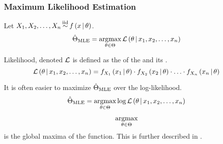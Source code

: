 		\subsubsection{Maximum Likelihood Estimation} \label{subsubsec:Maximum Likelihood Estimation}
			\begin{definition} \label{def:Maximum Likelihood Estimation}
				Let $ X_{1},X_{2},\ldots,X_{n} \operatorname{\overset{\text{iid}}{\operatorname{\sim}}} f \left( x \operatorname{\vert} \theta \right) $.
				\begin{equation} \label{eq:Maximum Likelihood Estimation}
					\hat{\Theta}_{\operatorname{\operatorname{MLE}}} = \operatorname*{argmax}_{\theta \in \Theta} \operatorname{\mathcal{L}} \left( \theta \operatorname{\vert} x_{1},x_{2},\ldots,x_{n} \right)
				\end{equation}
				\begin{remark} \label{rmk:Likelihood}
					Likelihood, denoted $\operatorname{\mathcal{L}}$ is defined as the  of the  and its .
					\begin{equation} \label{eq:Likelihood}
						\operatorname{\mathcal{L}} \left( \theta \operatorname{\vert} x_{1},x_{2},\ldots,x_{n} \right) = f_{X_{1}} \left( x_{1} \operatorname{\vert} \theta \right) \cdot f_{X_{2}} \left( x_{2} \operatorname{\vert} \theta \right) \cdot \ldots \cdot f_{X_{n}} \left( x_{n} \operatorname{\vert} \theta \right)
					\end{equation}
				\end{remark}
				\begin{remark}
					It is often easier to maximize $\hat{\Theta}_{\operatorname{\operatorname{MLE}}}$ over the log-likelihood.
					\begin{equation*}
						\hat{\Theta}_{\operatorname{\operatorname{MLE}}} = \operatorname*{argmax}_{\theta \in \Theta} \log \operatorname{\mathcal{L}} \left( \theta \operatorname{\vert} x_{1},x_{2},\ldots,x_{n} \right)
					\end{equation*}
				\end{remark}
				\begin{remark}
					\[ \operatorname*{argmax}_{\theta \in \Theta} \] is the global maxima of the function. This is further described in .
				\end{remark}
			\end{definition}
	
